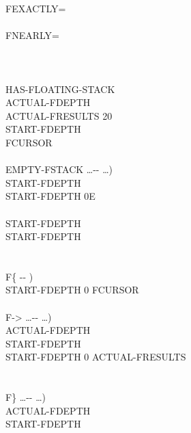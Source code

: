 \begin{tt}
\tab[3]  FEXACTLY= \\
\tab[2]  \\
\tab[3]  FNEARLY= \\
\tab[2]  \word{;} \\
\word[tools]{[THEN]} \\
\\
HAS-FLOATING-STACK \word[tools]{[IF]} \\
\tab {} ACTUAL-FDEPTH \\
\tab {} ACTUAL-FRESULTS 20   \\
\tab {} START-FDEPTH \\
\tab {} FCURSOR \\
\\
\tab \word{:} EMPTY-FSTACK  \ldots -{}- \ldots ) \\
\tab[2]  START-FDEPTH    \\
\tab[3]    START-FDEPTH    0E  \\
\tab[2]  \\
\tab[2]  START-FDEPTH    \\
\tab[3]    START-FDEPTH     \\
\tab[2]  \word{;} \\
\\
\tab \word{:} F\{  -{}- ) \\
\tab[2]  START-FDEPTH \word{!} 0 FCURSOR \word{!} \word{;} \\
\\
\tab \word{:} F->  \ldots -{}- \ldots ) \\
\tab[2]   ACTUAL-FDEPTH \word{!} \\
\tab[2] START-FDEPTH    \\
\tab[3]    START-FDEPTH  \word{-} 0  ACTUAL-FRESULTS   \word{+}   \\
\tab[2]  \word{;} \\
\\
\tab \word{:} F\}  \ldots -{}- \ldots ) \\
\tab[2]  ACTUAL-FDEPTH  \word{=}  \\
\tab[3]   START-FDEPTH    \\

\end{tt}
